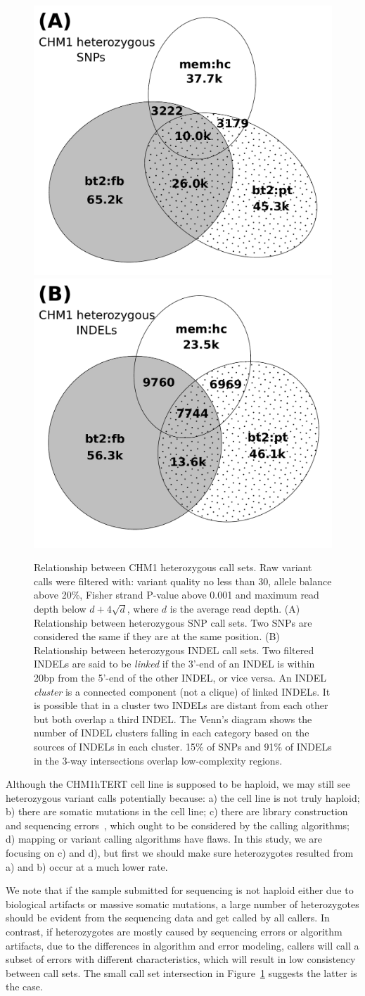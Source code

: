 \documentclass{bioinfo}
\begin{document}
\begin{figure}
\includegraphics[width=.24\textwidth]{venn2/CHM1-snp}\includegraphics[width=.24\textwidth]{venn2/CHM1-indel}
\caption{Relationship between CHM1 heterozygous call sets. Raw variant calls were filtered
with: variant quality no less than 30, allele balance above 20\%, Fisher strand
P-value above 0.001 and maximum read depth below $d+4\sqrt{d}$, where $d$ is
the average read depth. (A) Relationship between heterozygous SNP call sets. Two SNPs are
considered the same if they are at the same position. (B) Relationship between heterozygous
INDEL call sets. Two filtered INDELs are said to be \emph{linked} if the 3'-end
of an INDEL is within 20bp from the 5'-end of the other INDEL, or vice versa.
An INDEL \emph{cluster} is a connected component (not a clique) of linked
INDELs. It is possible that in a cluster two INDELs are distant from each other
but both overlap a third INDEL.  The Venn's diagram shows the number of INDEL
clusters falling in each category based on the sources of INDELs in each
cluster. 15\% of SNPs and 91\% of INDELs in the 3-way intersections overlap
low-complexity regions.}\label{fig:venn-CHM1}
\end{figure}

Although the CHM1hTERT cell line is supposed to be haploid, we may still see
heterozygous variant calls potentially because: a) the cell line is not truly
haploid; b) there are somatic mutations in the cell line; c) there are
library construction and sequencing errors~\citep{Robasky:2014aa}, which ought
to be considered by the calling algorithms; d) mapping or variant calling
algorithms have flaws. In this study, we are focusing on c) and d), but first
we should make sure heterozygotes resulted from a) and b) occur at a much lower
rate.

We note that if the sample submitted for sequencing is not haploid either due
to biological artifacts or massive somatic mutations, a large number of
heterozygotes should be evident from the sequencing data and get called by all
callers. In contrast, if heterozygotes are mostly caused by sequencing errors
or algorithm artifacts, due to the differences in algorithm and error modeling,
callers will call a subset of errors with different characteristics, which will
result in low consistency between call sets. The small call set intersection in
Figure~\ref{fig:venn-CHM1} suggests the latter is the case.
\end{document}
